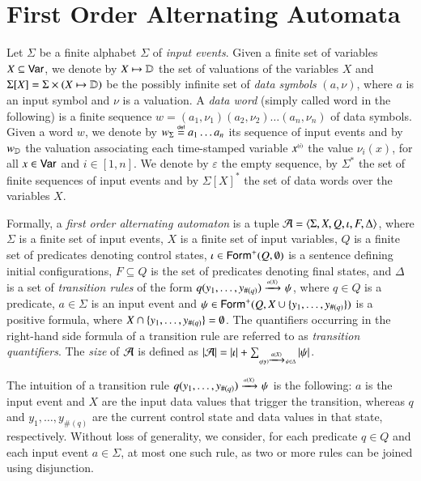 \section{First Order Alternating Automata}

Let $\Sigma$ be a finite alphabet $\Sigma$ of \emph{input
  events}. Given a finite set of variables $X \subseteq \mathsf{Var}$, we
denote by $X \mapsto \mathbb{D}$ the set of valuations of the variables $X$
and $\Sigma[X] = \Sigma \times (X \mapsto \mathbb{D})$ be the possibly
infinite set of \emph{data symbols} $(a,\nu)$, where $a$ is an input
symbol and $\nu$ is a valuation. A \emph{data word} (simply called
word in the following) is a finite sequence $w=(a_1,\nu_1)(a_2,\nu_2)
\ldots (a_n,\nu_n)$ of data symbols. Given a word $w$, we denote by
${w}_\Sigma \stackrel{\scriptscriptstyle{\mathsf{def}}}{=} a_1\ldots a_n$ its sequence of input events and by
${w}_{\mathbb{D}}$ the valuation associating each time-stamped variable
${x}^{\scriptscriptstyle{({i})}}$ the value $\nu_i(x)$, for all $x \in \mathsf{Var}$ and
$i\in[1,n]$. We denote by $\varepsilon$ the empty sequence, by
$\Sigma^*$ the set of finite sequences of input events and by
$\Sigma[X]^*$ the set of data words over the variables $X$. 

Formally, a \emph{first order alternating automaton} is a tuple $\mathcal{A} =
\langle \Sigma,X,Q,\iota,F,\Delta \rangle$, where $\Sigma$ is a finite set of
input events, $X$ is a finite set of input variables, $Q$ is a finite
set of predicates denoting control states, $\iota \in
\mathsf{Form}^+(Q,\emptyset)$ is a sentence defining initial configurations,
$F \subseteq Q$ is the set of predicates denoting final states, and
$\Delta$ is a set of \emph{transition rules} of the form
\(q(y_1,\ldots,y_{\#(q)}) \xrightarrow{{\scriptscriptstyle a(X)}}_{{\scriptstyle }} \psi\), where $q \in Q$ is a
predicate, $a \in \Sigma$ is an input event and $\psi \in
\mathsf{Form}^+(Q,X \cup \{ y_1,\ldots,y_{\#(q)} \})$ is a positive formula,
where $X \cap \{ y_1,\ldots,y_{\#(q)} \} = \emptyset$. The quantifiers
occurring in the right-hand side formula of a transition rule are
referred to as \emph{transition quantifiers}. The \emph{size} of $\mathcal{A}$
is defined as ${|{\mathcal{A}}|} = {|{\iota}|} +
\sum_{\scriptscriptstyle{q(\mathbf y) \xrightarrow{{\scriptscriptstyle a(X)}}_{{\scriptstyle }} \psi \in \Delta}}
{|{\psi}|}$.

The intuition of a transition rule \(q(y_1,\ldots,y_{\#(q)})
\xrightarrow{{\scriptscriptstyle a(X)}}_{{\scriptstyle }} \psi\) is the following: $a$ is the input event and $X$
are the input data values that trigger the transition, whereas $q$ and
$y_1,\ldots,y_{\#(q)}$ are the current control state and data values
in that state, respectively. Without loss of generality, we consider,
for each predicate $q \in Q$ and each input event $a \in \Sigma$, at
most one such rule, as two or more rules can be joined using
disjunction.

